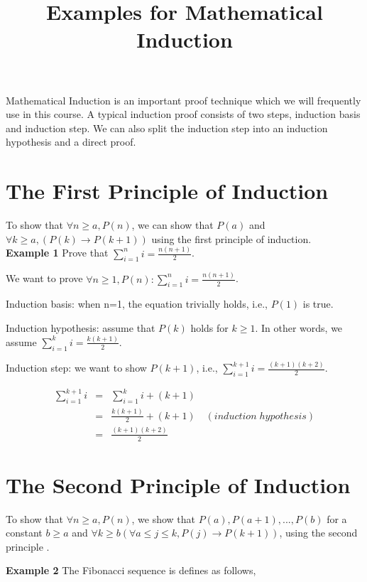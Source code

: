 \documentclass {article}
\title{Examples for Mathematical Induction}
\begin{document}
\maketitle
                                                                                      

Mathematical Induction is an important proof technique which we will
frequently use in this course. A typical induction proof consists of
two steps, induction basis and induction step. We can also split
the induction step into an induction hypothesis and a direct proof.

\section{The First Principle of Induction}

To show that $\forall n \ge a, P(n)$, we can show that $P(a)$ and $\forall k \ge
a, (P(k) \rightarrow P(k+1))$ using the first principle of induction. \\

{\bf Example 1} Prove that $\sum_{i=1}^{n}i= \frac{n(n+1)}{2}$.

We want to prove $\forall n \ge 1, P(n): \sum_{i=1}^{n}i= \frac{n(n+1)}{2}$.

Induction basis:  when n=1, the equation trivially holds, i.e., $P(1)$ is true.

Induction hypothesis: assume that $P(k)$ holds for $k \ge 1$. In other words,
we assume $\sum_{i=1}^{k}i= \frac{k(k+1)}{2}$.

Induction step: we want to show $P(k+1)$, i.e., $\sum_{i=1}^{k+1}i=
\frac{(k+1)(k+2)}{2}$.

\begin{eqnarray*}
\sum_{i=1}^{k+1}i &=& \sum_{i=1}^{k}i + (k+1) \\
&=&  \frac{k(k+1)}{2} +(k+1) \quad (induction \; hypothesis)  \\
&=&  \frac{(k+1)(k+2)}{2}
\end{eqnarray*}


\section {The Second Principle of Induction}

To show that $\forall n \ge a, P(n)$, we show that $P(a), P(a+1),..., P(b)$
for a constant $b \ge a$ and $\forall k \ge
b (\forall a \le j \le k, P(j) \rightarrow P(k+1))$, using the second principle .

{\bf Example 2} The Fibonacci sequence is defines as follows,
\end{document}
